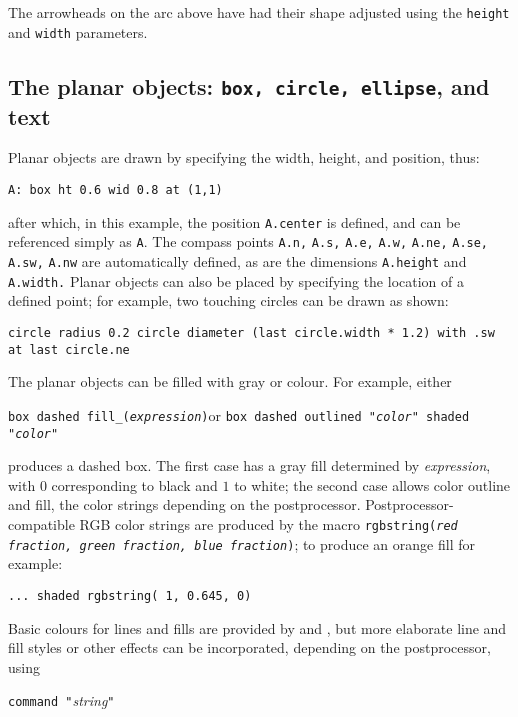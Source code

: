 The arrowheads on the arc above have had their shape adjusted using the
{\tt height} and {\tt width} parameters.

\subsection{The planar objects: {\tt box, circle, ellipse}, and text%
\label{Planarobjects:}}
Planar objects are drawn by specifying the width, height, and position, thus:

{\tt A: box ht 0.6 wid 0.8 at (1,1)}

\noindent
after which, in this example, the position {\tt A.center} is defined,
and can be referenced simply as {\tt A}.
The compass points {\tt A.n,} {\tt A.s,} {\tt A.e,} {\tt A.w,} {\tt A.ne,}
{\tt A.se,} {\tt A.sw,} {\tt A.nw} are automatically defined, as are
the dimensions {\tt A.height} and {\tt A.width.}
Planar objects can also be placed by specifying the location of a defined
point; for example, two touching circles can be drawn as shown:

{\tt circle radius 0.2\hfill\break 
\hspace*{\parindent}%
circle diameter (last circle.width * 1.2) with .sw at last circle.ne}

The planar objects can be filled with gray or colour.
For example, either

{\tt box dashed fill\_({\sl expression})}\quad or\quad
 {\tt box dashed outlined "{\sl color}" shaded "{\sl color}"}

\noindent
produces a dashed box. The first case has a gray fill determined by
{\sl expression}, with $0$ corresponding to black and $1$ to white;
the second case allows color outline and fill, the color strings depending on
the postprocessor.
Postprocessor-compatible RGB color strings are produced by the macro
{\tt rgbstring({\sl red fraction, green fraction, blue fraction})};
to produce an orange fill for example:

{\tt ... shaded rgbstring( 1, 0.645, 0)}

Basic colours for lines and fills are provided by \gpic  and \dpic,
but more elaborate line and fill styles or other effects
can be incorporated, depending on the postprocessor, using

{\tt command "}{\sl string}{\tt "}

